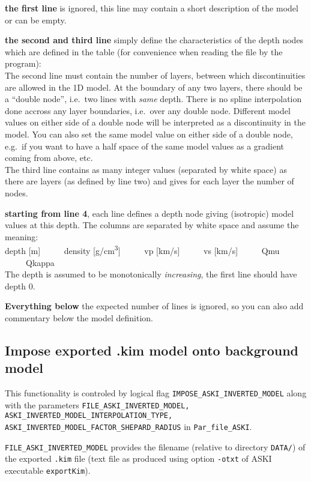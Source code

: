 \documentclass[12pt,a4paper]{article}
\newcommand{\lcode}[1]{\nolinkurl{#1}}
\newcommand{\lcodetitle}[1]{ {\ttfamily #1} }
\newcommand{\ASKI}{ {\ttfamily ASKI} }
\begin{document}
{\bf the first line} is ignored, this line may contain a short description of the model or can be empty.

{\bf the second and third line} simply define the characteristics of the depth nodes which are defined 
in the table (for convenience when reading the file by the program):\\
The second line must contain the number of layers, between which discontinuities are allowed in the 1D model. 
At the boundary of any two layers, there should be a ``double node'', i.e.\ two lines with \emph{same} depth. 
There is no spline interpolation done accross any layer boundaries, i.e.\ over any double node. 
Different model values on either side of a double node will be interpreted as a discontinuity in the model. 
You can also set the same model value on either side of a double node, e.g.\ if you want to have a half space
of the same model values as a gradient coming from above, etc.\\
The third line contains as many integer values (separated by white space) as there are layers 
(as defined by line two) and gives for each layer the number of nodes. 

{\bf starting from line 4}, each line defines a depth node giving (isotropic) model values at this depth.
The columns are separated by white space and assume the meaning:\\
depth [m] \ \ \ \ \ density [g/cm\textsuperscript{3}] \ \ \ \ \ vp [km/s] \ \ \ \ \ vs [km/s] \ \ \ \ \ Qmu \ \ \ \ \ Qkappa\\
The depth is assumed to be monotonically \emph{increasing}, the first line should have depth 0. 

{\bf Everything below} the expected number of lines is ignored, so you can also add commentary below the
model definition.

\subsection{Impose exported \lcodetitle{.kim} model onto background model} \label{import_model:ssec_kim_export}
This functionality is controled by logical flag \lcode{IMPOSE_ASKI_INVERTED_MODEL} along with
the parameters \lcode{FILE_ASKI_INVERTED_MODEL, ASKI_INVERTED_MODEL_INTERPOLATION_TYPE, 
ASKI_INVERTED_MODEL_FACTOR_SHEPARD_RADIUS} in \lcode{Par_file_ASKI}.

\lcode{FILE_ASKI_INVERTED_MODEL} provides the filename (relative to directory \lcode{DATA/}) of the exported 
\lcode{.kim} file (text file as produced using option \lcode{-otxt} of \ASKI{} executable \lcode{exportKim}).
\end{document}
